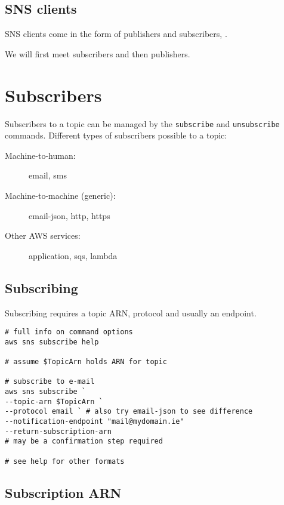 \subsection{SNS clients}\label{sns-clients}

SNS clients come in the form of publishers and subscribers, .

We will first meet subscribers and then publishers.

\section{Subscribers}\label{subscribers}

Subscribers to a topic can be managed by the \texttt{subscribe} and
\texttt{unsubscribe} commands. Different types of subscribers possible
to a topic:



\begin{description}
\item[Machine-to-human:]
email, sms
\item[Machine-to-machine (generic):]
email-json, http, https
\item[Other AWS services:]
application, sqs, lambda
\end{description}

\subsection{Subscribing}\label{subscribing}

Subscribing requires a topic ARN, protocol and usually an endpoint.

\begin{verbatim}
# full info on command options
aws sns subscribe help

# assume $TopicArn holds ARN for topic

# subscribe to e-mail 
aws sns subscribe `
--topic-arn $TopicArn `
--protocol email ` # also try email-json to see difference
--notification-endpoint "mail@mydomain.ie"
--return-subscription-arn
# may be a confirmation step required

# see help for other formats
\end{verbatim}

\subsection{Subscription ARN}\label{subscription-arn}

